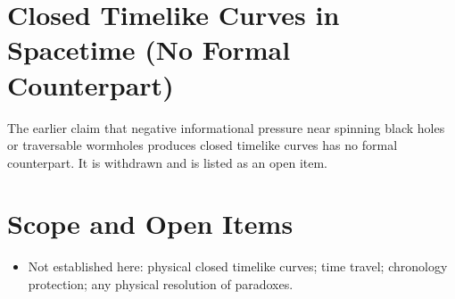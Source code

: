 \documentclass[11pt, a4paper]{article}
\begin{document}
\section{Closed Timelike Curves in Spacetime (No Formal Counterpart)}
The earlier claim that negative informational pressure near spinning black holes or traversable wormholes produces closed timelike curves has no formal counterpart. It is withdrawn and is listed as an open item.

\section{Scope and Open Items}
\begin{itemize}
  \item Not established here: physical closed timelike curves; time travel; chronology protection; any physical resolution of paradoxes.
\end{itemize}
\end{document}
